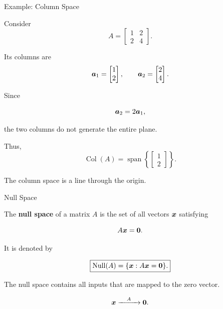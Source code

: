 
\begin{frame}{Example: Column Space}

Consider
\vspace{-0.1cm}
\[
A=
\begin{bmatrix}
1&2\\
2&4
\end{bmatrix}.
\]

Its columns are
\vspace{-0.1cm}
\[
\bm{a}_1=
\begin{bmatrix}
1\\2
\end{bmatrix},
\qquad
\bm{a}_2=
\begin{bmatrix}
2\\4
\end{bmatrix}.
\]

Since

\[
\bm{a}_2=2\bm{a}_1,
\]

the two columns do not generate the entire plane.

Thus,
\vspace{-0.1cm}
\[
\boxed{
\operatorname{Col}(A)
=
\operatorname{span}
\left\{
\begin{bmatrix}
1\\2
\end{bmatrix}
\right\}.
}
\]

The column space is a line through the origin.

\end{frame}



\begin{frame}{Null Space}

The \textbf{null space} of a matrix $A$ is the set of all
vectors $\bm{x}$ satisfying

\[
A\bm{x}=\mathbf{0}.
\]

It is denoted by

\[
\boxed{
\operatorname{Null}(A)
=
\{\bm{x}:A\bm{x}=\mathbf{0}\}.
}
\]

\vspace{0.4cm}

The null space contains all inputs that are mapped to
the zero vector.

\[
\bm{x}
\xrightarrow{\quad A\quad}
\mathbf{0}.
\]

\end{frame}


